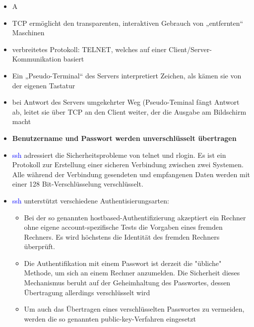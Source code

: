 \begin{itemize}
    \item \todo A
\end{itemize}

\begin{itemize}
    \item TCP ermöglicht den transparenten, interaktiven Gebrauch von „entfernten“ Maschinen
    \item verbreitetes Protokoll: TELNET, welches auf einer Client/Server-Kommunikation basiert
    \item Ein „Pseudo-Terminal“ des Servers interpretiert Zeichen, als kämen sie von der eigenen Tastatur
    \item bei Antwort des Servers umgekehrter Weg (Pseudo-Teminal fängt Antwort ab, leitet sie über TCP an den Client weiter, der die Ausgabe am Bildschirm macht
    \item \textbf{Benutzername und Passwort werden unverschlüsselt übertragen}
\end{itemize}

\begin{itemize}
    \item \textcolor{blue}{ssh} adressiert die Sicherheitsprobleme von telnet und rlogin.
    Es ist ein Protokoll zur Erstellung einer sicheren Verbindung zwischen zwei Systemen.
    Alle während der Verbindung gesendeten und empfangenen Daten werden mit einer 128 Bit-Verschlüsselung verschlüsselt.
    \item \textcolor{blue}{ssh} unterstützt verschiedene Authentisierungsarten:
    \begin{itemize}
        \item Bei der so genannten hostbased-Authentifizierung akzeptiert ein Rechner ohne eigene account-spezifische Tests die Vorgaben eines fremden Rechners. Es wird höchstens die Identität des fremden Rechners überprüft.
        \item Die Authentifikation mit einem Passwort ist derzeit die "übliche" Methode, um sich an einem Rechner anzumelden. Die Sicherheit dieses Mechanismus beruht auf der Geheimhaltung des Passwortes, dessen Übertragung allerdings verschlüsselt wird
        \item Um auch das Übertragen eines verschlüsselten Passwortes zu vermeiden, werden die so genannten public-key-Verfahren eingesetzt
    \end{itemize}
\end{itemize}

